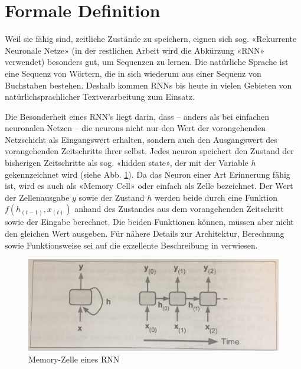 \section{Formale Definition}
\label{sec:model-definition}

Weil sie fähig sind, zeitliche Zustände zu speichern, eignen sich sog. «Rekurrente Neuronale Netze» (in der restlichen Arbeit wird die Abkürzung «RNN» verwendet) besonders gut, um Sequenzen zu lernen.
Die natürliche Sprache ist eine Sequenz von Wörtern, die in sich wiederum aus einer Sequenz von Buchstaben bestehen.
Deshalb kommen RNNs bis heute in vielen Gebieten von natürlichsprachlicher Textverarbeitung zum Einsatz.

Die Besonderheit eines RNN's liegt darin, dass – anders als bei einfachen neuronalen Netzen – die \glspl{neuron} nicht nur den Wert der vorangehenden Netzschicht als
Eingangswert erhalten, sondern auch den Ausgangswert des vorangehenden Zeitschritts ihrer selbst.
Jedes \gls{neuron} speichert den Zustand der bisherigen Zeitschritte als sog. «hidden state», der mit der Variable $ h $ gekennzeichnet wird (siehe Abb. \ref{fig:rnn-model-definition-memory-cell}).
Da das Neuron einer Art Erinnerung fähig ist, wird es auch als «Memory Cell» oder einfach als Zelle bezeichnet.
Der Wert der Zellenausgabe $ y $ sowie der Zustand $ h $ werden beide durch eine Funktion $ f(h_{(t-1)}, x_{(t)})$ anhand des Zustandes aus dem vorangehenden Zeitschritt sowie der Eingabe berechnet.
Die beiden Funktionen können, müssen aber nicht den gleichen Wert ausgeben.
Für nähere Details zur Architektur, Berechnung sowie Funktionsweise sei auf die exzellente Beschreibung in \autocite{geron} verwiesen.

\begin{figure}
    \centering
    \includegraphics[width=0.75\linewidth]{images/model/model-rnn-definition.jpg}
    \caption[RNN Modell]{Memory-Zelle eines RNN \autocite{geron}}
    \label{fig:rnn-model-definition-memory-cell}
\end{figure}

